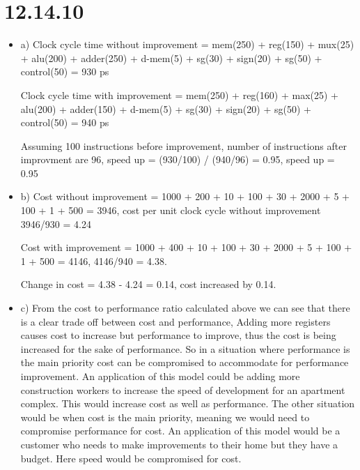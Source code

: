 \documentclass{article}
\begin{document}
\section{12.14.10}

\begin{itemize}
    \item a) Clock cycle time without improvement = mem(250) + reg(150) + mux(25) + alu(200) + adder(250) + d-mem(5) + sg(30) + sign(20) + sg(50) + control(50) = 930 ps \newline
    
    Clock cycle time with improvement = mem(250) + reg(160) + max(25) + alu(200) + adder(150) + d-mem(5) + sg(30) + sign(20) + sg(50) + control(50) = 940 ps\newline
    
    Assuming 100 instructions before improvement, number of instructions after improvment are 96, speed up = (930/100) / (940/96) = 0.95, speed up = 0.95 \newline
    
    \item b) Cost without improvement = 1000 + 200 + 10 + 100 + 30 + 2000 + 5 + 100 + 1 + 500 = 3946, cost per unit clock cycle without improvement 3946/930 = 4.24 \newline
    
    Cost with improvement = 1000 + 400 + 10 + 100 + 30 + 2000 + 5 + 100 + 1 + 500 = 4146, 4146/940 = 4.38. \newline
    
    Change in cost = 4.38 - 4.24 = 0.14, cost increased by 0.14. \newline 

    \item c) From the cost to performance ratio calculated above we can see that there is a clear trade off between cost and performance, Adding more registers causes cost to increase but performance to improve, thus the cost is being increased for the sake of performance. So in a situation where performance is the main priority cost can be compromised to accommodate for performance improvement. An application of this model could be adding more construction workers to increase the speed of development for an apartment complex. This would increase cost as well as performance. The other situation would be when cost is the main priority, meaning we would need to compromise performance for cost. An application of this model would be a customer who needs to make improvements to their home but they have a budget. Here speed would be compromised for cost. \newline 
\end{itemize}
\end{document}
